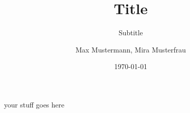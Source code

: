 \documentclass[f1,todos=off]{HsH-report} %
\author{
	Max Mustermann,
	Mira Musterfrau
}
\title{Title}
\subtitle{Subtitle}
\date{\today}
\begin{document}
	your stuff goes here
\end{document}
